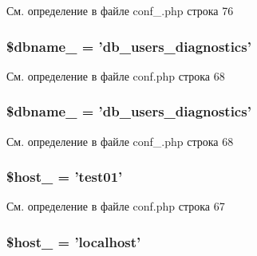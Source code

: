См. определение в файле conf\-\_\-.\-php строка 76

\hypertarget{group___d_b__1_gab06b43f5844a74e58c253d1313d698c7}{
\subsubsection[{\$dbname\-\_\-1}]{\setlength{\rightskip}{0pt plus 5cm}\$dbname\-\_ = 'db\-\_\-users\-\_\-diagnostics'}}\label{group___d_b__1_gab06b43f5844a74e58c253d1313d698c7}


См. определение в файле conf.\-php строка 68

\hypertarget{group___d_b__1_gab06b43f5844a74e58c253d1313d698c7}{
\subsubsection[{\$dbname\-\_\-1}]{\setlength{\rightskip}{0pt plus 5cm}\$dbname\-\_ = 'db\-\_\-users\-\_\-diagnostics'}}\label{group___d_b__1_gab06b43f5844a74e58c253d1313d698c7}


См. определение в файле conf\-\_\-.\-php строка 68

\hypertarget{group___d_b__1_gaaef75b195cd712a695148aa5ea925ff6}{
\subsubsection[{\$host\-\_\-1}]{\setlength{\rightskip}{0pt plus 5cm}\$host\-\_ = 'test01'}}\label{group___d_b__1_gaaef75b195cd712a695148aa5ea925ff6}


См. определение в файле conf.\-php строка 67

\hypertarget{group___d_b__1_gaaef75b195cd712a695148aa5ea925ff6}{
\subsubsection[{\$host\-\_\-1}]{\setlength{\rightskip}{0pt plus 5cm}\$host\-\_ = 'localhost'}}\label{group___d_b__1_gaaef75b195cd712a695148aa5ea925ff6}



